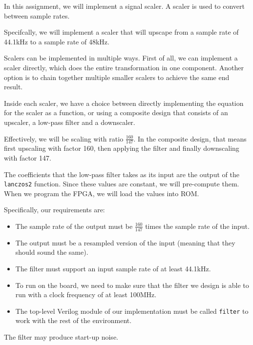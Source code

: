 
In this assignment, we will implement a signal scaler.
A scaler is used to convert between sample rates.

Specifcally, we will implement a scaler that will upscape from a sample rate of 44.1kHz to a sample rate of 48kHz.

Scalers can be implemented in multiple ways.
First of all, we can implement a scaler directly, which does the entire transformation in one component.
Another option is to chain together multiple smaller scalers to achieve the same end result.

Inside each scaler, we have a choice between directly implementing the equation for the scaler as a function, or using a composite design that consists of an upscaler, a low-pass filter and a downscaler.

Effectively, we will be scaling with ratio $\frac{160}{147}$.
In the composite design, that means first upscaling with factor 160, then applying the filter and finally downscaling with factor 147.

The coefficients that the low-pass filter takes as its input are the output of the \texttt{lanczos2} function.
Since these values are constant, we will pre-compute them.
When we program the FPGA, we will load the values into ROM.

Specifically, our requirements are:

\begin{itemize}
	\item The sample rate of the output must be $\frac{160}{147}$ times the sample rate of the input.
	\item The output must be a resampled version of the input (meaning that they should sound the same).
	\item The filter must support an input sample rate of at least 44.1kHz.
	\item To run on the board, we need to make sure that the filter we design is able to run with a clock frequency of at least 100MHz.
	\item The top-level Verilog module of our implementation must be called \texttt{filter} to work with the rest of the environment.
\end{itemize}

The filter may produce start-up noise.
